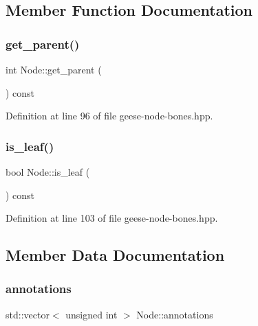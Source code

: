 \subsection{Member Function Documentation}
\mbox{\label{class_node_a661cb63a33e950b84c9c093c63d1ab63}} 
\subsubsection{\texorpdfstring{get\+\_\+parent()}{get\_parent()}}
{\footnotesize\ttfamily int Node\+::get\+\_\+parent (\begin{DoxyParamCaption}{ }\end{DoxyParamCaption}) const\hspace{0.3cm}{\ttfamily [inline]}}



Definition at line 96 of file geese-\/node-\/bones.\+hpp.

\mbox{\label{class_node_af7cc2d0f435e3bee4388a0e9ab42adb8}} 
\subsubsection{\texorpdfstring{is\+\_\+leaf()}{is\_leaf()}}
{\footnotesize\ttfamily bool Node\+::is\+\_\+leaf (\begin{DoxyParamCaption}{ }\end{DoxyParamCaption}) const\hspace{0.3cm}{\ttfamily [inline]}}



Definition at line 103 of file geese-\/node-\/bones.\+hpp.



\subsection{Member Data Documentation}
\mbox{\label{class_node_aea43a76094980788d1debd3e18ed8070}} 
\subsubsection{\texorpdfstring{annotations}{annotations}}
{\footnotesize\ttfamily std\+::vector$<$ unsigned int $>$ Node\+::annotations}




